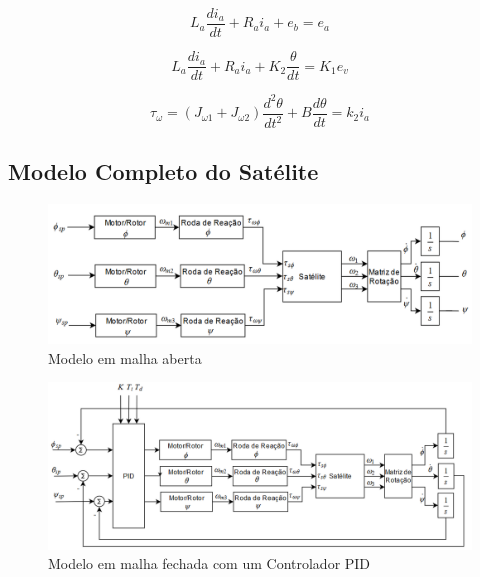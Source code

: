 \begin{equation}
L_a \frac{di_a}{dt}+R_a i_a + e_b = e_a
\end{equation}

\begin{equation}
L_a \frac{di_a}{dt}+R_a i_a + K_2\frac{\theta}{dt} = K_1e_v
\end{equation}

\begin{equation}
\tau_{\omega} = (J_{\omega 1} + J_{\omega 2})\frac{d^{2}\theta}{dt^{2}}+B\frac{d\theta}{dt} = k_2 i_a
\end{equation}


\subsection{Modelo Completo do Satélite}

\begin{figure}[H]
  \caption{Modelo em malha aberta}
  \begin{center}
      \includegraphics[scale=.55]{img/modelo_satelite_malha_aberta}
  \end{center}
  \label{fig:modelo_satelite_malha_aberta}
\end{figure}


\begin{figure}[H]
  \caption{Modelo em malha fechada com um Controlador PID}
  \begin{center}
      \includegraphics[scale=.55]{img/modelo_satelite_pid}
  \end{center}
  \label{fig:modelo_satelite_pid}
\end{figure}


